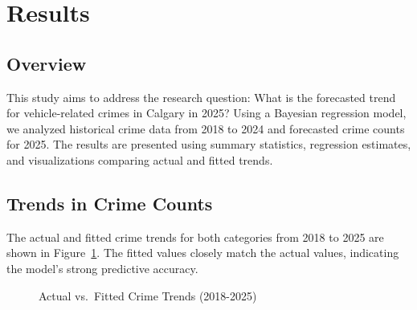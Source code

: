 \documentclass[
  letterpaper,
  DIV=11,
  numbers=noendperiod]{scrartcl}
\begin{document}
\section{Results}\label{results}

\subsection{Overview}\label{overview-1}

This study aims to address the research question: What is the forecasted
trend for vehicle-related crimes in Calgary in 2025? Using a Bayesian
regression model, we analyzed historical crime data from 2018 to 2024
and forecasted crime counts for 2025. The results are presented using
summary statistics, regression estimates, and visualizations comparing
actual and fitted trends.

\subsection{Trends in Crime Counts}\label{trends-in-crime-counts}

The actual and fitted crime trends for both categories from 2018 to 2025
are shown in Figure~\ref{fig-forcast-trend}. The fitted values closely
match the actual values, indicating the model's strong predictive
accuracy.

\begin{figure}


\caption{\label{fig-forcast-trend}Actual vs.~Fitted Crime Trends
(2018-2025)}

\end{figure}%
\end{document}
